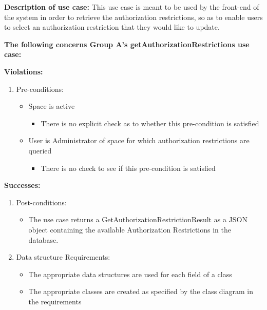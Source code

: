 \textbf{Description of use case:}\newline
This use case is meant to be used by the front-end of the system in order to retrieve the authorization restrictions, so as to enable users to select an authorization restriction that they would like to update.


\noindent
\medskip

\textbf{The following concerns Group A's getAuthorizationRestrictions use case:}\newline

\textbf{Violations:}
\begin{enumerate}
	\item Pre-conditions:	
	\begin{itemize}
		\item Space is active
		\begin{itemize}
				\item There is no explicit check as to whether this pre-condition is satisfied
		\end{itemize}
		\item User is Administrator of space for which authorization restrictions are queried
		\begin{itemize}
				\item There is no check to see if this pre-condition is satisfied
		\end{itemize}
	\end{itemize}
\end{enumerate}	
\textbf{Successes:}
\begin{enumerate}
\item Post-conditions:
	\begin{itemize}
		\item The use case returns a GetAuthorizationRestrictionResult as a JSON object containing the available Authorization Restrictions in the database.
	\end{itemize}

\item Data structure Requirements:
	\begin{itemize}
		\item The appropriate data structures are used for each field of a class
		\item The appropriate classes are created as specified by the class diagram in the requirements
	\end{itemize}

\end{enumerate}

\noindent
\medskip

